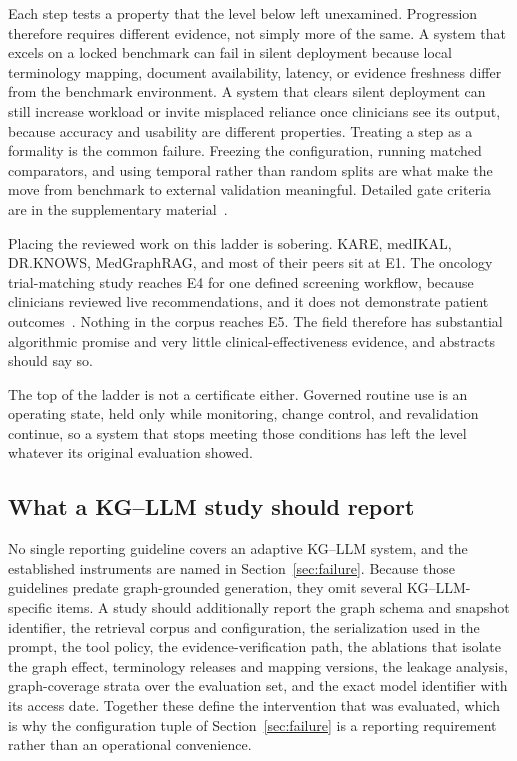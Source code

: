 Each step tests a property that the level below left unexamined. Progression therefore requires different evidence, not simply more of the same. A system that excels on a locked benchmark can fail in silent deployment because local terminology mapping, document availability, latency, or evidence freshness differ from the benchmark environment. A system that clears silent deployment can still increase workload or invite misplaced reliance once clinicians see its output, because accuracy and usability are different properties. Treating a step as a formality is the common failure. Freezing the configuration, running matched comparators, and using temporal rather than random splits are what make the move from benchmark to external validation meaningful. Detailed gate criteria are in the supplementary material~\cite{supplementary}.

Placing the reviewed work on this ladder is sobering. KARE, medIKAL, DR.KNOWS, MedGraphRAG, and most of their peers sit at E1. The oncology trial-matching study reaches E4 for one defined screening workflow, because clinicians reviewed live recommendations, and it does not demonstrate patient outcomes~\cite{loaizabonilla2026trialmatch}. Nothing in the corpus reaches E5. The field therefore has substantial algorithmic promise and very little clinical-effectiveness evidence, and abstracts should say so.

The top of the ladder is not a certificate either. Governed routine use is an operating state, held only while monitoring, change control, and revalidation continue, so a system that stops meeting those conditions has left the level whatever its original evaluation showed.

\subsection{What a KG--LLM study should report}

No single reporting guideline covers an adaptive KG--LLM system, and the established instruments are named in Section~\ref{sec:failure}. Because those guidelines predate graph-grounded generation, they omit several KG--LLM-specific items. A study should additionally report the graph schema and snapshot identifier, the retrieval corpus and configuration, the serialization used in the prompt, the tool policy, the evidence-verification path, the ablations that isolate the graph effect, terminology releases and mapping versions, the leakage analysis, graph-coverage strata over the evaluation set, and the exact model identifier with its access date. Together these define the intervention that was evaluated, which is why the configuration tuple of Section~\ref{sec:failure} is a reporting requirement rather than an operational convenience.

